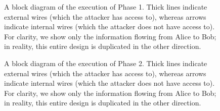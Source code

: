 \documentclass[a4paper]{report}
\begin{document}
\begin{figure}
\label{fig3}
%
\centering \caption{A block diagram of the execution of Phase 1. Thick lines indicate external wires (which the attacker has access to), whereas arrows indicate internal wires (which the attacker does not have access to). For clarity, we show only the information flowing from Alice to Bob; in reality, this entire design is duplicated in the other direction.}
\end{figure}

\begin{figure}
\label{fig3b}
%
\centering \caption{A block diagram of the execution of Phase 2. Thick lines indicate external wires (which the attacker has access to), whereas arrows indicate internal wires (which the attacker does not have access to). For clarity, we show only the information flowing from Alice to Bob; in reality, this entire design is duplicated in the other direction.}
\end{figure}
\end{document}
